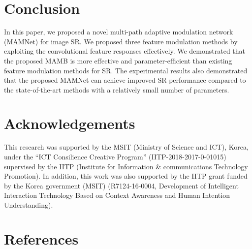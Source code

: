 \documentclass[final,5p,times,twocolumn]{elsarticle}
\begin{document}
\section{Conclusion}
\label{section:conclusion}
In this paper, we proposed a novel multi-path adaptive modulation network (MAMNet) for image SR. 
We proposed three feature modulation methods by exploiting the convolutional feature responses effectively.
We demonstrated that the proposed MAMB is more effective and parameter-efficient than existing feature modulation methods for SR.
The experimental results also demonstrated that the proposed MAMNet can achieve improved SR performance compared to the state-of-the-art methods with a relatively small number of parameters.



\section*{Acknowledgements}
This research was supported by the MSIT (Ministry of Science and ICT), Korea, under the ``ICT Consilience Creative Program'' (IITP-2018-2017-0-01015) supervised by the IITP (Institute for Information \& communications Technology Promotion). In addition, this work was also supported by the IITP grant funded by the Korea government (MSIT) (R7124-16-0004, Development of Intelligent Interaction Technology Based on Context Awareness and Human Intention Understanding).

\section*{References}

\end{document}
